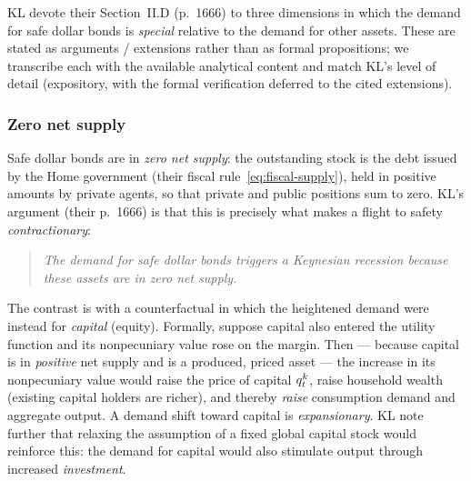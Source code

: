 KL devote their Section~II.D (p.~1666) to three dimensions in which the demand
for safe dollar bonds is \emph{special} relative to the demand for other assets.
These are stated as arguments / extensions rather than as formal propositions; we
transcribe each with the available analytical content and match KL's level of
detail (expository, with the formal verification deferred to the cited
extensions).

\subsubsection{Zero net supply}
\label{sec:zero-net-supply}

Safe dollar bonds are in \emph{zero net supply}: the outstanding stock is the debt
issued by the Home government (their fiscal rule~\eqref{eq:fiscal-supply}), held
in positive amounts by private agents, so that private and public positions sum to
zero. KL's argument (their p.~1666) is that this is precisely what makes a flight
to safety \emph{contractionary}:
\begin{quote}
\emph{The demand for safe dollar bonds triggers a Keynesian recession because
these assets are in zero net supply.}
\end{quote}
The contrast is with a counterfactual in which the heightened demand were instead
for \emph{capital} (equity). Formally, suppose capital also entered the utility
function and its nonpecuniary value rose on the margin. Then --- because capital
is in \emph{positive} net supply and is a produced, priced asset --- the increase
in its nonpecuniary value would raise the price of capital $q^{k}_t$, raise
household wealth (existing capital holders are richer), and thereby \emph{raise}
consumption demand and aggregate output. A demand shift toward capital is
\emph{expansionary}. KL note further that relaxing the assumption of a fixed
global capital stock would reinforce this: the demand for capital would also
stimulate output through increased \emph{investment}.

